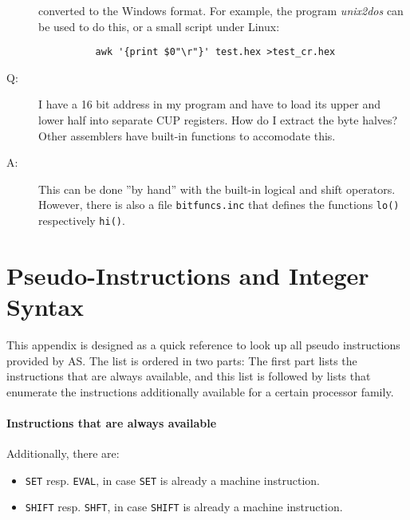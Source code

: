 \documentclass[12pt,twoside]{report}
\newcommand{\tty}[1]{{\tt #1}}
\begin{document}
\begin{description}
{          converted to the Windows format.  For example, the program
          {\em unix2dos} can be used to do this, or a small script under
          Linux:
          \begin{verbatim}
          awk '{print $0"\r"}' test.hex >test_cr.hex
          \end{verbatim}}
\item[Q:]{I have a 16 bit address in my program and have to load its
          upper and lower half into separate CUP registers. How do I
          extract the byte halves? Other assemblers have built-in
          functions to accomodate this.}
\item[A:]{This can be done ''by hand'' with the built-in logical and
          shift operators.  However, there is also a file {\tt bitfuncs.inc}
          that defines the functions {\tt lo()} respectively {\tt hi()}.}
\end{description}


\cleardoublepage
\chapter{Pseudo-Instructions and Integer Syntax}
\label{SectPseudoInst}

This appendix is designed as a quick reference to look up all pseudo
instructions provided by AS.  The list is ordered in two parts: The
first part lists the instructions that are always available, and this
list is followed by lists that enumerate the instructions
additionally available for a certain processor family.

\subsubsection{Instructions that are always available}

Additionally, there are:
\begin{itemize}
\item{\tty{SET} resp. \tty{EVAL}, in case \tty{SET} is already a machine
      instruction.}
\item{\tty{SHIFT} resp. \tty{SHFT}, in case \tty{SHIFT} is already a machine
      instruction.}
\end{itemize}



\end{document}
